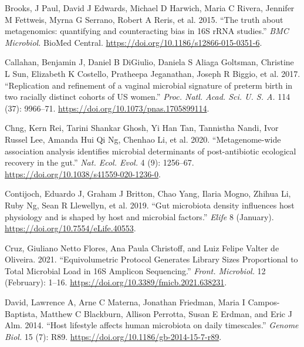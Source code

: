 \documentclass[
]{article}
\newlength{\cslhangindent}
\newlength{\cslentryspacingunit} %
\newenvironment{CSLReferences}[2] %
 {%
  \setlength{\parindent}{0pt}
  \ifodd #1
  \let\oldpar\par
  \def\par{\hangindent=\cslhangindent\oldpar}
  \fi
  \setlength{\parskip}{#2\cslentryspacingunit}
 }%
 {}
\begin{document}
\hypertarget{refs}{}
\begin{CSLReferences}{1}{0}
\leavevmode{}%
Brooks, J Paul, David J Edwards, Michael D Harwich, Maria C Rivera, Jennifer M Fettweis, Myrna G Serrano, Robert A Reris, et al. 2015. {``{The truth about metagenomics: quantifying and counteracting bias in 16S rRNA studies}.''} \emph{BMC Microbiol.} BioMed Central. \url{https://doi.org/10.1186/s12866-015-0351-6}.

\leavevmode{}%
Callahan, Benjamin J, Daniel B DiGiulio, Daniela S Aliaga Goltsman, Christine L Sun, Elizabeth K Costello, Pratheepa Jeganathan, Joseph R Biggio, et al. 2017. {``{Replication and refinement of a vaginal microbial signature of preterm birth in two racially distinct cohorts of US women}.''} \emph{Proc. Natl. Acad. Sci. U. S. A.} 114 (37): 9966--71. \url{https://doi.org/10.1073/pnas.1705899114}.

\leavevmode{}%
Chng, Kern Rei, Tarini Shankar Ghosh, Yi Han Tan, Tannistha Nandi, Ivor Russel Lee, Amanda Hui Qi Ng, Chenhao Li, et al. 2020. {``{Metagenome-wide association analysis identifies microbial determinants of post-antibiotic ecological recovery in the gut}.''} \emph{Nat. Ecol. Evol.} 4 (9): 1256--67. \url{https://doi.org/10.1038/s41559-020-1236-0}.

\leavevmode{}%
Contijoch, Eduardo J, Graham J Britton, Chao Yang, Ilaria Mogno, Zhihua Li, Ruby Ng, Sean R Llewellyn, et al. 2019. {``{Gut microbiota density influences host physiology and is shaped by host and microbial factors}.''} \emph{Elife} 8 (January). \url{https://doi.org/10.7554/eLife.40553}.

\leavevmode{}%
Cruz, Giuliano Netto Flores, Ana Paula Christoff, and Luiz Felipe Valter de Oliveira. 2021. {``{Equivolumetric Protocol Generates Library Sizes Proportional to Total Microbial Load in 16S Amplicon Sequencing}.''} \emph{Front. Microbiol.} 12 (February): 1--16. \url{https://doi.org/10.3389/fmicb.2021.638231}.

\leavevmode{}%
David, Lawrence A, Arne C Materna, Jonathan Friedman, Maria I Campos-Baptista, Matthew C Blackburn, Allison Perrotta, Susan E Erdman, and Eric J Alm. 2014. {``{Host lifestyle affects human microbiota on daily timescales}.''} \emph{Genome Biol.} 15 (7): R89. \url{https://doi.org/10.1186/gb-2014-15-7-r89}.


\end{CSLReferences}
\end{document}
